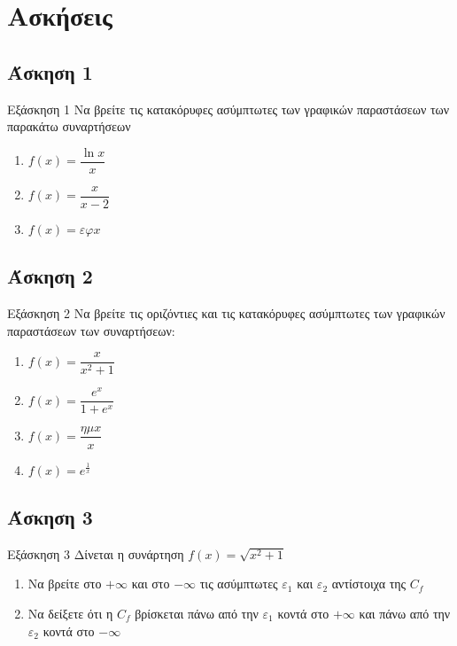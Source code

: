 \documentclass[greek]{beamer}
\begin{document}
\section{Ασκήσεις}
\subsection{Άσκηση 1}
\begin{frame}[label=Άσκηση1,t]{Εξάσκηση 1}
    Να βρείτε τις κατακόρυφες ασύμπτωτες των γραφικών παραστάσεων των παρακάτω συναρτήσεων
    \begin{enumerate}
        \item<1-> $f(x)=\dfrac{\ln x}{x}$
        \item<2-> $f(x)=\dfrac{x}{x-2}$
        \item<3-> $f(x)=εφ x$
    \end{enumerate}

\end{frame}

\subsection{Άσκηση 2}
\begin{frame}[label=Άσκηση2,t]{Εξάσκηση 2}
    Να βρείτε τις οριζόντιες και τις κατακόρυφες ασύμπτωτες των γραφικών παραστάσεων των συναρτήσεων:
    \begin{enumerate}
        \item<1-> $f(x)=\dfrac{x}{x^2+1}$
        \item<2-> $f(x)=\dfrac{e^x}{1+e^x}$
        \item<3-> $f(x)=\dfrac{ημx}{x}$
        \item<4-> $f(x)=e^{\frac{1}{x}}$
    \end{enumerate}

\end{frame}

\subsection{Άσκηση 3}
\begin{frame}[label=Άσκηση3,t]{Εξάσκηση 3}
    Δίνεται η συνάρτηση $f(x)=\sqrt{x^2+1}$
    \begin{enumerate}
        \item<1-> Να βρείτε στο $+\infty$ και στο $-\infty$ τις ασύμπτωτες $ε_1$ και $ε_2$ αντίστοιχα της $C_f$
        \item<2-> Να δείξετε ότι η $C_f$ βρίσκεται πάνω από την $ε_1$ κοντά στο $+\infty$ και πάνω από την $ε_2$ κοντά στο $-\infty$
    \end{enumerate}

\end{frame}
\end{document}
